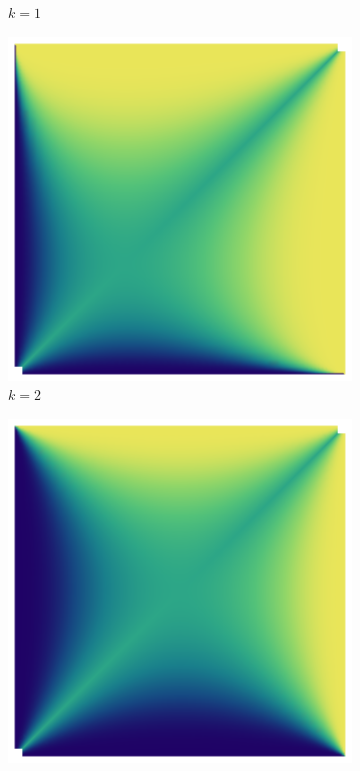 \documentclass{article}
\theoremstyle{definition}
\begin{document}
\begin{figure}[H]
\begin{subfigure}[b]{0.130\textwidth}
        \caption{$k=1$}
        \label{fig:ppkBG_6_1}
    \end{subfigure}
    \hspace{0.00\textwidth} %
    \begin{subfigure}[b]{0.130\textwidth}
        \includegraphics[width=\textwidth]{img/BinomialBayesian_ppk_6_2.png}
        \caption{$k=2$}
        \label{fig:ppkBG_6_2}
    \end{subfigure}
    \hspace{0.00\textwidth} %
        \begin{subfigure}[b]{0.130\textwidth}
        \includegraphics[width=\textwidth]{img/BinomialBayesian_ppk_6_3.png}

\end{subfigure}
\end{figure}
\end{document}

